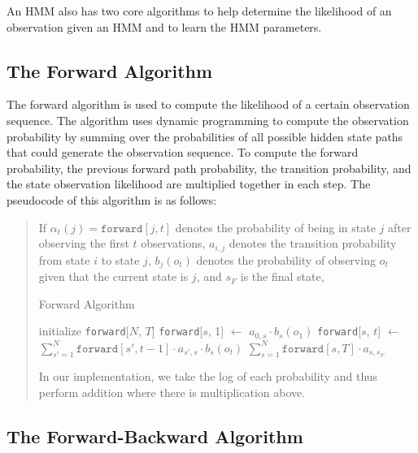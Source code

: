 \documentclass{article}
\begin{document}
An HMM also has two core algorithms to help determine the likelihood of an observation given an HMM and to learn the HMM parameters.

\subsection{The Forward Algorithm}\label{sec:forward-alg}

The forward algorithm is used to compute the likelihood of a certain observation sequence. The algorithm uses dynamic programming to compute the observation probability by summing over the probabilities of all possible hidden state paths that could generate the observation sequence. To compute the forward probability, the previous forward path probability, the transition probability, and the state observation likelihood are multiplied together in each step. The pseudocode of this algorithm is as follows:

\begin{quote}
If $\alpha_t(j) = \texttt{forward}[j, t]$ denotes the probability of being in state $j$ after observing the first $t$ observations, $a_{i,j}$ denotes the transition probability from state $i$ to state $j$, $b_j(o_t)$ denotes the probability of observing $o_t$ given that the current state is $j$, and $s_F$ is the final state,
\begin{algorithm}
\caption{Forward Algorithm}
\begin{algorithmic}
    \State initialize \texttt{forward}[$N$, $T$]
        \State \texttt{forward}[$s$, 1] $\gets$ $a_{0, s} \cdot b_s (o_1)$
    \EndFor
            \State \texttt{forward}[$s$, $t$] $\gets$ 
            $\displaystyle \sum_{s' = 1}^{N} \texttt{forward}[s', t - 1]
                                             \cdot a_{s', s} \cdot b_s(o_t)$
        \EndFor
    \EndFor
    \Return $\sum_{s = 1}^{N} \texttt{forward}[s, T] \cdot a_{s, s_F}$
    \EndProcedure
\end{algorithmic}
\end{algorithm}

In our implementation, we take the log of each probability and thus perform addition where there is multiplication above.
\end{quote}

\subsection{The Forward-Backward Algorithm}\label{sec:bw-alg}
\end{document}
